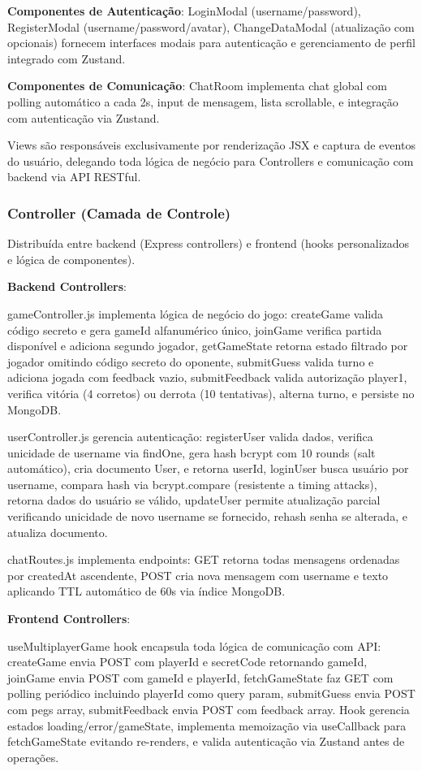 \documentclass[conference]{IEEEtran}
\begin{document}
\textbf{Componentes de Autenticação}: LoginModal (username/password), RegisterModal (username/password/avatar), ChangeDataModal (atualização com opcionais) fornecem interfaces modais para autenticação e gerenciamento de perfil integrado com Zustand.

\textbf{Componentes de Comunicação}: ChatRoom implementa chat global com polling automático a cada 2s, input de mensagem, lista scrollable, e integração com autenticação via Zustand.

Views são responsáveis exclusivamente por renderização JSX e captura de eventos do usuário, delegando toda lógica de negócio para Controllers e comunicação com backend via API RESTful.

\subsubsection{Controller (Camada de Controle)}

Distribuída entre backend (Express \cite{express:2024} controllers) e frontend (hooks personalizados e lógica de componentes).

\textbf{Backend Controllers}:

gameController.js implementa lógica de negócio do jogo: createGame valida código secreto e gera gameId alfanumérico único, joinGame verifica partida disponível e adiciona segundo jogador, getGameState retorna estado filtrado por jogador omitindo código secreto do oponente, submitGuess valida turno e adiciona jogada com feedback vazio, submitFeedback valida autorização player1, verifica vitória (4 corretos) ou derrota (10 tentativas), alterna turno, e persiste no MongoDB.

userController.js gerencia autenticação: registerUser valida dados, verifica unicidade de username via findOne, gera hash bcrypt \cite{bcrypt:2024} com 10 rounds (salt automático), cria documento User, e retorna userId, loginUser busca usuário por username, compara hash via bcrypt.compare (resistente a timing attacks), retorna dados do usuário se válido, updateUser permite atualização parcial verificando unicidade de novo username se fornecido, rehash senha se alterada, e atualiza documento.

chatRoutes.js implementa endpoints: GET retorna todas mensagens ordenadas por createdAt ascendente, POST cria nova mensagem com username e texto aplicando TTL automático de 60s via índice MongoDB.

\textbf{Frontend Controllers}:

useMultiplayerGame hook encapsula toda lógica de comunicação com API: createGame envia POST com playerId e secretCode retornando gameId, joinGame envia POST com gameId e playerId, fetchGameState faz GET com polling periódico incluindo playerId como query param, submitGuess envia POST com pegs array, submitFeedback envia POST com feedback array. Hook gerencia estados loading/error/gameState, implementa memoização via useCallback para fetchGameState evitando re-renders, e valida autenticação via Zustand antes de operações.
\end{document}
